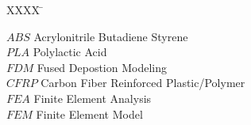 
\begin{tabbing}

  XXXX \= \kill%

  $ABS$ \> Acrylonitrile Butadiene Styrene\\
  $PLA$ \> Polylactic Acid\\
  $FDM$ \> Fused Depostion Modeling\\
  $CFRP$ \> Carbon Fiber Reinforced Plastic/Polymer\\
  $FEA$ \> Finite Element Analysis\\
  $FEM$ \> Finite Element Model\\
  
\end{tabbing}

